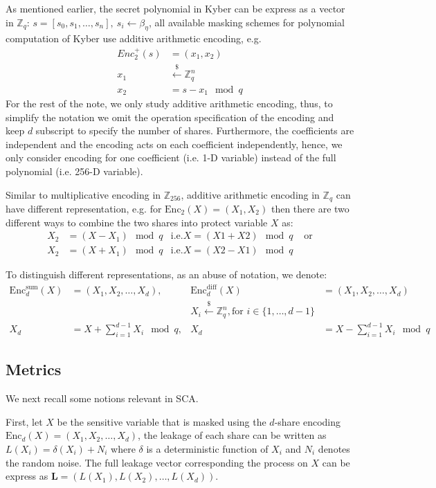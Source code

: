 \documentclass{llncs}
\begin{document}
As mentioned earlier, the secret polynomial in Kyber can be express as a vector in $\mathbb{Z}_q$:
$s = [s_0, s_1, \dots, s_n],\ s_i \leftarrow \beta_{\eta}$, all available masking schemes for polynomial computation of Kyber  use additive arithmetic encoding, e.g.
\begin{align*}
	Enc_2^{+}(s) &= (x_1, x_2)\\
	x_1 &\overset{\$}{\leftarrow} \mathbb{Z}_q^n\\
	x_2 &= s-x_1 \mod q
\end{align*}
For the rest of the note, we only study additive arithmetic encoding, thus, to simplify the notation we omit the operation specification of the encoding and keep $d$ subscript to specify the number of shares. Furthermore, the coefficients are independent  and the encoding acts on each coefficient independently, hence, we only consider encoding for one coefficient (i.e. 1-D variable) instead of the full polynomial (i.e. 256-D variable).

Similar to multiplicative encoding in $\mathbb{Z}_{256}$, additive arithmetic encoding in $\mathbb{Z}_q$ can have different representation, e.g. for $\text{Enc}_{2}(X) = (X_1, X_2)$ then there are two different ways to combine the two shares into protect variable $X$ as:
\begin{align*}
	X_2 &= (X - X_1) \mod q & \text{i.e.} X = (X1 + X2)\mod q & \text{ or}\\
	X_2 &= (X + X_1) \mod q & \text{i.e.} X = (X2 - X1)\mod q
\end{align*}

To distinguish different representations, as an abuse of notation, we denote:
\begin{align*}
	\text{Enc}^{\text{sum}}_{d}(X) &= (X_1, X_2, \dots, X_d)   ,  &  \text{Enc}^{\text{diff}}_{d}(X) &= (X_1, X_2, \dots, X_d) \\
	& &X_i \overset{\$}{\leftarrow} \mathbb{Z}_q^n, \text{for } i \in \{1, \dots, d-1\}\\
	X_d &= X + \sum_{i =1}^{d-1}X_i \mod q  ,  &  X_d &= X - \sum_{i =1}^{d-1}X_i \mod q 
\end{align*}
\subsection*{Metrics}
We next recall some notions relevant in SCA.

First, let $X$ be the sensitive variable that is masked using the $d$-share encoding $\text{Enc}_d(X) = (X_1, X_2, \dots, X_d)$, the leakage of each share can be written as $L(X_i) = \delta(X_i) + N_i$ where $\delta$ is a deterministic function of $X_i$ and $N_i$ denotes the random noise. The full leakage vector corresponding the process on $X$ can be express as $\mathbf{L} = (L(X_1), L(X_2), \dots, L(X_d))$.
\end{document}

